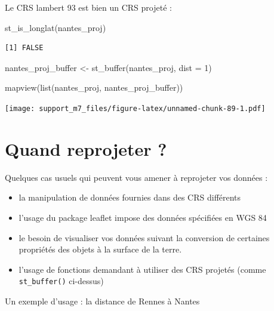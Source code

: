 \documentclass[
]{book}
\newenvironment{Shaded}{\begin{snugshade}}{\end{snugshade}}
\newcommand{\AttributeTok}[1]{\textcolor[rgb]{0.77,0.63,0.00}{#1}}
\newcommand{\DecValTok}[1]{\textcolor[rgb]{0.00,0.00,0.81}{#1}}
\newcommand{\FunctionTok}[1]{\textcolor[rgb]{0.00,0.00,0.00}{#1}}
\newcommand{\NormalTok}[1]{#1}
\newcommand{\OtherTok}[1]{\textcolor[rgb]{0.56,0.35,0.01}{#1}}
\begin{document}
Le CRS lambert 93 est bien un CRS projeté :

\begin{Shaded}
\begin{Highlighting}[]
\FunctionTok{st\_is\_longlat}\NormalTok{(nantes\_proj)}
\end{Highlighting}
\end{Shaded}

\begin{verbatim}
[1] FALSE
\end{verbatim}

\begin{Shaded}
\begin{Highlighting}[]
\NormalTok{nantes\_proj\_buffer }\OtherTok{\textless{}{-}} \FunctionTok{st\_buffer}\NormalTok{(nantes\_proj, }\AttributeTok{dist =} \DecValTok{1}\NormalTok{)}
\end{Highlighting}
\end{Shaded}

\begin{Shaded}
\begin{Highlighting}[]
\FunctionTok{mapview}\NormalTok{(}\FunctionTok{list}\NormalTok{(nantes\_proj, nantes\_proj\_buffer))}
\end{Highlighting}
\end{Shaded}

\texttt{[image: support\_m7\_files/figure-latex/unnamed-chunk-89-1.pdf]}

\hypertarget{quand-reprojeter}{%
\section{Quand reprojeter ?}\label{quand-reprojeter}}

Quelques cas usuels qui peuvent vous amener à reprojeter vos données :

\begin{itemize}
\item
  la manipulation de données fournies dans des CRS différents
\item
  l'usage du package leaflet impose des données spécifiées en WGS 84
\item
  le besoin de visualiser vos données suivant la conversion de certaines propriétés des objets à la surface de la terre.
\item
  l'usage de fonctions demandant à utiliser des CRS projetés (comme \texttt{st\_buffer()} ci-dessus)
\end{itemize}

Un exemple d'usage : la distance de Rennes à Nantes
\end{document}
